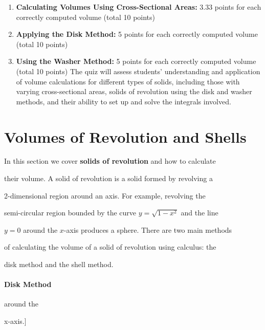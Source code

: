 \begin{enumerate}
    \item \textbf{Calculating Volumes Using Cross-Sectional Areas:} 3.33 points for each correctly computed volume (total 10 points)
    \item \textbf{Applying the Disk Method:} 5 points for each correctly computed volume (total 10 points)
    \item \textbf{Using the Washer Method:} 5 points for each correctly computed volume (total 10 points) The quiz will assess students' understanding and application of volume calculations for different types of solids, including those with varying cross-sectional areas, solids of revolution using the disk and washer methods, and their ability to set up and solve the integrals involved.
\end{enumerate}

\section{Volumes of Revolution and Shells}
\label{sec:volumes-of-revolution-and-shells}

In this section we cover \textbf{solids of revolution} and how to calculate

their volume. A solid of revolution is a solid formed by revolving a

2-dimensional region around an axis. For example, revolving the

semi-circular region bounded by the curve $y=\sqrt{1-x^2}$ and the line

$y=0$ around the $x$-axis produces a sphere. There are two main methods

of calculating the volume of a solid of revolution using calculus: the

disk method and the shell method.



\paragraph{Disk Method}




around the

x-axis.]


